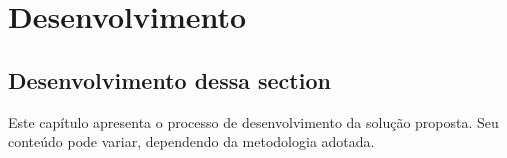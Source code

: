 	\newpage
\chapter{Desenvolvimento}
\label{ch:desenvolvimento}

\section{Desenvolvimento dessa section}
\par Este capítulo apresenta o processo de desenvolvimento da solução proposta. Seu conteúdo pode variar, dependendo da metodologia adotada.
